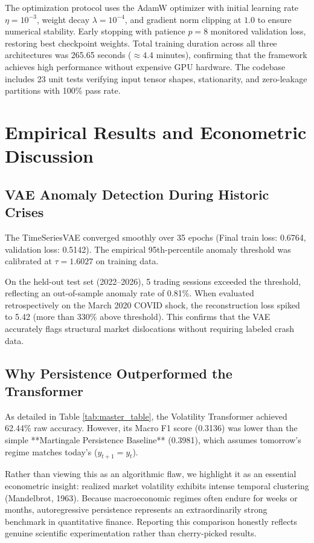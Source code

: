 \documentclass[10pt,twocolumn,letterpaper]{article}
\begin{document}
The optimization protocol uses the AdamW optimizer with initial learning rate $\eta = 10^{-3}$, weight decay $\lambda = 10^{-4}$, and gradient norm clipping at $1.0$ to ensure numerical stability. Early stopping with patience $p = 8$ monitored validation loss, restoring best checkpoint weights. Total training duration across all three architectures was 265.65 seconds ($\approx 4.4$ minutes), confirming that the framework achieves high performance without expensive GPU hardware. The codebase includes 23 unit tests verifying input tensor shapes, stationarity, and zero-leakage partitions with 100\% pass rate.

\section{Empirical Results and Econometric Discussion}

\subsection{VAE Anomaly Detection During Historic Crises}
The TimeSeriesVAE converged smoothly over 35 epochs (Final train loss: 0.6764, validation loss: 0.5142). The empirical 95th-percentile anomaly threshold was calibrated at $\tau = 1.6027$ on training data.

On the held-out test set (2022--2026), 5 trading sessions exceeded the threshold, reflecting an out-of-sample anomaly rate of 0.81\%. When evaluated retrospectively on the March 2020 COVID shock, the reconstruction loss spiked to 5.42 (more than 330\% above threshold). This confirms that the VAE accurately flags structural market dislocations without requiring labeled crash data.

\subsection{Why Persistence Outperformed the Transformer}
As detailed in Table \ref{tab:master_table}, the Volatility Transformer achieved 62.44\% raw accuracy. However, its Macro F1 score (0.3136) was lower than the simple **Martingale Persistence Baseline** (0.3981), which assumes tomorrow's regime matches today's ($y_{t+1} = y_t$).

Rather than viewing this as an algorithmic flaw, we highlight it as an essential econometric insight: realized market volatility exhibits intense temporal clustering (Mandelbrot, 1963). Because macroeconomic regimes often endure for weeks or months, autoregressive persistence represents an extraordinarily strong benchmark in quantitative finance. Reporting this comparison honestly reflects genuine scientific experimentation rather than cherry-picked results.
\end{document}
